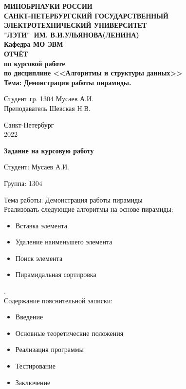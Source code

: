 \documentclass{article}
\date{\today}
\begin{document}
\thispagestyle{empty}
\begin{center}
    \LARGE\textbf{МИНОБРНАУКИ РОССИИ\\
        САНКТ-ПЕТЕРБУРГСКИЙ ГОСУДАРСТВЕННЫЙ\\
        ЭЛЕКТРОТЕХНИЧЕСКИЙ УНИВЕРСИТЕТ\\
        "ЛЭТИ"\ ИМ. В.И.УЛЬЯНОВА(ЛЕНИНА)\\
        Кафедра МО ЭВМ}\\[6cm]
    \Large\textbf{ОТЧЁТ}\\[0.2cm]
    \Large\textbf{по курсовой работе}\\[0.1cm]
    \Large\textbf{по дисциплине <<Алгоритмы и структуры данных>>}\\[0.1cm]
    \Large\textbf{Тема: Демонстрация работы пирамиды.}\\[5cm]
\end{center}
\Large{Студент гр. 1304 \qquad \qquad \quad \underline{\hspace{4cm}} \qquad \qquad Мусаев А.И.}\\[0.5cm]
\Large{Преподаватель \qquad \qquad \qquad \underline{\hspace{4cm}} \qquad \qquad Шевская Н.В.}\\[1cm]
\begin{center}
    Санкт-Петербург\\
    2022
\end{center}
\newpage
\begin{center}
    \textbf{Задание на курсовую работу}
\end{center}

Студент: Мусаев А.И.

Группа: 1304

Тема работы: Демонстрация работы пирамиды\\

Реализовать следующие алгоритмы на основе пирамиды:

\begin{itemize}
    \item Вставка элемента
    \item Удаление наименьшего элемента
    \item Поиск элемента
    \item Пирамидальная сортировка
\end{itemize}.\\

Содержание пояснительной записки:

\begin{itemize}
    \item Введение
    \item Основные теоретические положения
    \item Реализация программы
    \item Тестирование
    \item Заключение
\end{itemize}
\end{document}
